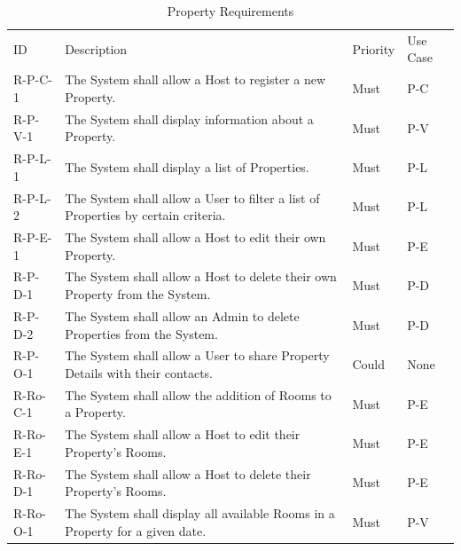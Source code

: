 \begin{table}[H]
    \centering
    \begin{tabular}{| p{1.8cm} | p{9.7cm} | P{1.5cm} | P{2cm} | }
        \hline
          \\ \hline
         ID      & Description & Priority & Use Case \\ \hline
        R-P-C-1  & The System shall allow a Host to register a new Property. & Must & P-C \\ \hline
        R-P-V-1  & The System shall display information about a Property. & Must & P-V \\ \hline
        R-P-L-1  & The System shall display a list of Properties. & Must & P-L \\ \hline
        R-P-L-2  & The System shall allow a User to filter a list of Properties by certain criteria. & Must & P-L \\ \hline
        R-P-E-1  & The System shall allow a Host to edit their own Property. & Must & P-E \\ \hline
        R-P-D-1  & The System shall allow a Host to delete their own Property from the System. & Must & P-D \\ \hline
        R-P-D-2  & The System shall allow an Admin to delete Properties from the System. & Must & P-D \\ \hline
        R-P-O-1  & The System shall allow a User to share Property Details with their contacts. & Could & None \\ \hline
        R-Ro-C-1 & The System shall allow the addition of Rooms to a Property. & Must & P-E \\ \hline
        R-Ro-E-1 & The System shall allow a Host to edit their Property's Rooms. & Must & P-E \\ \hline
        R-Ro-D-1 & The System shall allow a Host to delete their Property's Rooms. & Must & P-E \\ \hline
        R-Ro-O-1 & The System shall display all available Rooms in a Property for a given date. & Must & P-V \\ \hline
    \end{tabular}
    \caption{Property Requirements}
    \label{requirements:properties}
\end{table}

